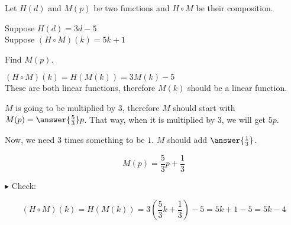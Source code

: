 \documentclass{ximera}
\begin{document}
\begin{example}


Let $H(d)$ and $M(p)$ be two functions and $H \circ M$ be their composition.


Suppose $H(d) = 3 d - 5$ \\

Suppose $(H \circ M)(k) = 5 k + 1$


Find $M(p)$.



\begin{explanation}




$(H \circ M)(k) = H(M(k)) = 3 M(k) - 5 $  \\




These are both linear functions, therefore $M(k)$ should be a linear function.


$M$ is going to be multiplied by $3$, therefore $M$ should start with $M(p) = \answer{\frac{5}{3}}p$. That way, when it is multiplied by $3$, we will get $5p$.




Now, we need $3$ times something to be $1$.  $M$ should add $\answer{\frac{1}{3}}$.

\[  M(p) =    \frac{5}{3} p +     \frac{1}{3} \]



$\blacktriangleright$ Check: 


\[    (H \circ M)(k) = H(M(k)) = 3 \left( \frac{5}{3} k + \frac{1}{3} \right) - 5 =    5 k + 1 -5 = 5 k -4    \]




\end{explanation} 

\end{example}
\end{document}
